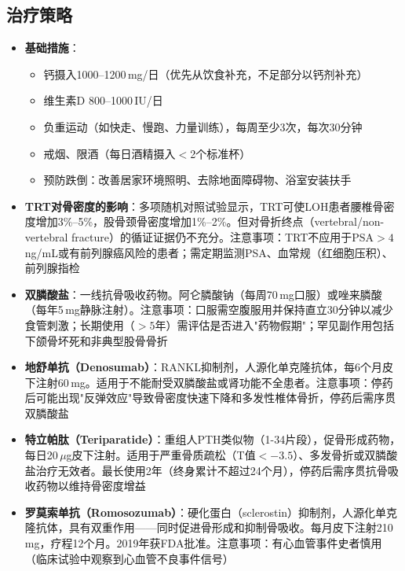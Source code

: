 \subsection{治疗策略}

\begin{itemize}[leftmargin=2cm]
	\item \textbf{基础措施}：
	\begin{itemize}
		\item 钙摄入1000--1200\,mg/日（优先从饮食补充，不足部分以钙剂补充）
		\item 维生素D 800--1000\,IU/日
		\item 负重运动（如快走、慢跑、力量训练），每周至少3次，每次30分钟
		\item 戒烟、限酒（每日酒精摄入$<$2个标准杯）
		\item 预防跌倒：改善居家环境照明、去除地面障碍物、浴室安装扶手
	\end{itemize}

	\item \textbf{TRT对骨密度的影响}：多项随机对照试验显示，TRT可使LOH患者腰椎骨密度增加3\%--5\%，股骨颈骨密度增加1\%--2\%。但对骨折终点（vertebral/non-vertebral fracture）的循证证据仍不充分。注意事项：TRT不应用于PSA$>4\,$ng/mL或有前列腺癌风险的患者；需定期监测PSA、血常规（红细胞压积）、前列腺指检

	\item \textbf{双膦酸盐}：一线抗骨吸收药物。阿仑膦酸钠（每周70\,mg口服）或唑来膦酸（每年5\,mg静脉注射）。注意事项：口服需空腹服用并保持直立30分钟以减少食管刺激；长期使用（$>5$年）需评估是否进入"药物假期"；罕见副作用包括下颌骨坏死和非典型股骨骨折

	\item \textbf{地舒单抗（Denosumab）}：RANKL抑制剂，人源化单克隆抗体，每6个月皮下注射60\,mg。适用于不能耐受双膦酸盐或肾功能不全患者。注意事项：停药后可能出现"反弹效应"导致骨密度快速下降和多发性椎体骨折，停药后需序贯双膦酸盐

	\item \textbf{特立帕肽（Teriparatide）}：重组人PTH类似物（1-34片段），促骨形成药物，每日20\,$\mu$g皮下注射。适用于严重骨质疏松（T值$< -3.5$）、多发骨折或双膦酸盐治疗无效者。最长使用2年（终身累计不超过24个月），停药后需序贯抗骨吸收药物以维持骨密度增益

	\item \textbf{罗莫索单抗（Romosozumab）}：硬化蛋白（sclerostin）抑制剂，人源化单克隆抗体，具有双重作用——同时促进骨形成和抑制骨吸收。每月皮下注射210\,mg，疗程12个月。2019年获FDA批准。注意事项：有心血管事件史者慎用（临床试验中观察到心血管不良事件信号）
\end{itemize}


